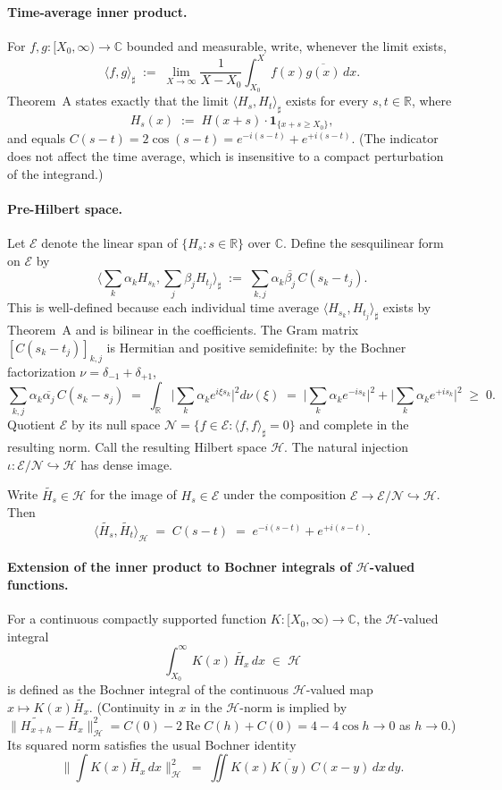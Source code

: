\documentclass[11pt]{article}
\theoremstyle{definition}
\theoremstyle{remark}
\DeclareMathOperator{\ReOp}{Re}
\let\Re\ReOp
\begin{document}
\paragraph{Time-average inner product.} For $f,g\colon[X_0,\infty)\to\mathbb{C}$ bounded and measurable, write, whenever the limit exists,
\[
  \langle f,g\rangle_\sharp\;:=\;\lim_{X\to\infty}\frac{1}{X-X_0}\int_{X_0}^X f(x)\overline{g(x)}\,dx.
\]
Theorem~A states exactly that the limit $\langle H_s,H_t\rangle_\sharp$ exists for every $s,t\in\mathbb{R}$, where
\[
  H_s(x)\;:=\;H(x+s)\cdot \mathbf{1}_{\{x+s\ge X_0\}},
\]
and equals $C(s-t)=2\cos(s-t)=e^{-i(s-t)}+e^{+i(s-t)}$. (The indicator does not affect the time average, which is insensitive to a compact perturbation of the integrand.)

\paragraph{Pre-Hilbert space.} Let $\mathcal{E}$ denote the linear span of $\{H_s:s\in\mathbb{R}\}$ over $\mathbb{C}$. Define the sesquilinear form on $\mathcal{E}$ by
\[
  \Big\langle\sum_k\alpha_k H_{s_k},\sum_j\beta_j H_{t_j}\Big\rangle_\sharp\;:=\;\sum_{k,j}\alpha_k\overline{\beta_j}\,C(s_k-t_j).
\]
This is well-defined because each individual time average $\langle H_{s_k},H_{t_j}\rangle_\sharp$ exists by Theorem~A and is bilinear in the coefficients. The Gram matrix $[C(s_k-t_j)]_{k,j}$ is Hermitian and positive semidefinite: by the Bochner factorization $\nu=\delta_{-1}+\delta_{+1}$,
\[
  \sum_{k,j}\alpha_k\overline{\alpha_j}\,C(s_k-s_j)\;=\;\int_{\mathbb{R}}\Big|\sum_k\alpha_k e^{i\xi s_k}\Big|^2 d\nu(\xi)\;=\;\Big|\sum_k\alpha_k e^{-is_k}\Big|^2+\Big|\sum_k\alpha_k e^{+is_k}\Big|^2\;\ge\;0.
\]
Quotient $\mathcal{E}$ by its null space $\mathcal{N}=\{f\in\mathcal{E}:\langle f,f\rangle_\sharp=0\}$ and complete in the resulting norm. Call the resulting Hilbert space $\mathcal{H}$. The natural injection $\iota:\mathcal{E}/\mathcal{N}\hookrightarrow\mathcal{H}$ has dense image.

Write $\widetilde{H_s}\in\mathcal{H}$ for the image of $H_s\in\mathcal{E}$ under the composition $\mathcal{E}\to\mathcal{E}/\mathcal{N}\hookrightarrow\mathcal{H}$. Then
\[
  \langle\widetilde{H_s},\widetilde{H_t}\rangle_{\mathcal{H}}\;=\;C(s-t)\;=\;e^{-i(s-t)}+e^{+i(s-t)}.
\]

\paragraph{Extension of the inner product to Bochner integrals of $\mathcal{H}$-valued functions.} For a continuous compactly supported function $K:[X_0,\infty)\to\mathbb{C}$, the $\mathcal{H}$-valued integral
\[
  \int_{X_0}^\infty K(x)\,\widetilde{H_x}\,dx\;\in\;\mathcal{H}
\]
is defined as the Bochner integral of the continuous $\mathcal{H}$-valued map $x\mapsto K(x)\widetilde{H_x}$. (Continuity in $x$ in the $\mathcal{H}$-norm is implied by $\|\widetilde{H_{x+h}}-\widetilde{H_x}\|_{\mathcal{H}}^2=C(0)-2\Re C(h)+C(0)=4-4\cos h\to 0$ as $h\to 0$.) Its squared norm satisfies the usual Bochner identity
\[
  \Big\|\int K(x)\widetilde{H_x}\,dx\Big\|_{\mathcal{H}}^2\;=\;\iint K(x)\overline{K(y)}\,C(x-y)\,dx\,dy.
\]
\end{document}
